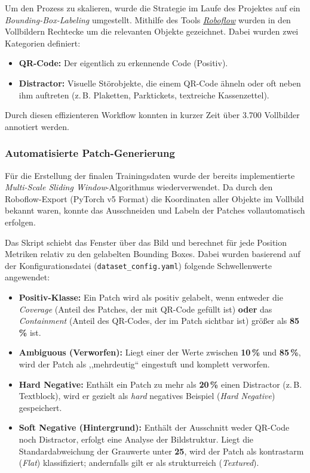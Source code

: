 \documentclass[
    a4paper,        %
    11pt,           %
    ngerman,        %
    parskip=half,   %
    listof=totoc,   %
    bibliography=totoc %
]{scrartcl}
\begin{document}
Um den Prozess zu skalieren, wurde die Strategie im Laufe des Projektes auf ein \textit{Bounding-Box-Labeling} umgestellt. Mithilfe des Tools \href{https://roboflow.com/}{\textit{Roboflow}} wurden in den Vollbildern Rechtecke um die relevanten Objekte gezeichnet. Dabei wurden zwei Kategorien definiert:
\begin{itemize}
    \item \textbf{QR-Code:} Der eigentlich zu erkennende Code (Positiv).
    \item \textbf{Distractor:} Visuelle Störobjekte, die einem QR-Code ähneln oder oft neben ihm auftreten (z.\,B. Plaketten, Parktickets, textreiche Kassenzettel).
\end{itemize}
Durch diesen effizienteren Workflow konnten in kurzer Zeit über 3.700 Vollbilder annotiert werden.

\subsubsection{Automatisierte Patch-Generierung} \label{subsubsec:automatische_patch_generierung}
Für die Erstellung der finalen Trainingsdaten wurde der bereits implementierte \textit{Multi-Scale Sliding Window}-Algorithmus wiederverwendet. Da durch den Roboflow-Export (PyTorch v5 Format) die Koordinaten aller Objekte im Vollbild bekannt waren, konnte das Ausschneiden und Labeln der Patches vollautomatisch erfolgen.

Das Skript schiebt das Fenster über das Bild und berechnet für jede Position Metriken relativ zu den gelabelten Bounding Boxes. Dabei wurden basierend auf der Konfigurationsdatei (\texttt{dataset\_config.yaml}) folgende Schwellenwerte angewendet:

\begin{itemize}
    \item \textbf{Positiv-Klasse:} Ein Patch wird als positiv gelabelt, wenn entweder die \textit{Coverage} (Anteil des Patches, der mit QR-Code gefüllt ist) \textbf{oder} das \textit{Containment} (Anteil des QR-Codes, der im Patch sichtbar ist) größer als \textbf{85\,\%} ist.
    
    \item \textbf{Ambiguous (Verworfen):} Liegt einer der Werte zwischen \textbf{10\,\%} und \textbf{85\,\%}, wird der Patch als ,,mehrdeutig`` eingestuft und komplett verworfen.
    
    \item \textbf{Hard Negative:} Enthält ein Patch zu mehr als \textbf{20\,\%} einen Distractor (z.\,B. Textblock), wird er gezielt als \textit{hard} negatives Beispiel (\textit{Hard Negative}) gespeichert.
    
    \item \textbf{Soft Negative (Hintergrund):} Enthält der Ausschnitt weder QR-Code noch Distractor, erfolgt eine Analyse der Bildstruktur. Liegt die Standardabweichung der Grauwerte unter \textbf{25}, wird der Patch als kontrastarm (\textit{Flat}) klassifiziert; andernfalls gilt er als strukturreich (\textit{Textured}).
\end{itemize}
\end{document}
